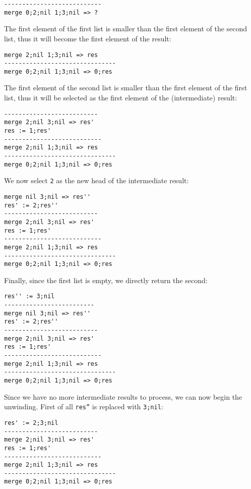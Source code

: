 \begin{lstlisting}
---------------------------
merge 0;2;nil 1;3;nil => ?
\end{lstlisting}

The first element of the first list is smaller than the first element of the second list, thus it will become the first element of the result:

\begin{lstlisting}
merge 2;nil 1;3;nil => res
-------------------------------
merge 0;2;nil 1;3;nil => 0;res
\end{lstlisting}

The first element of the second list is smaller than the first element of the first list, thus it will be selected as the first element of the (intermediate) result:

\begin{lstlisting}
--------------------------
merge 2;nil 3;nil => res'
res := 1;res'
---------------------------
merge 2;nil 1;3;nil => res
-------------------------------
merge 0;2;nil 1;3;nil => 0;res
\end{lstlisting}

We now select \texttt{2} as the new head of the intermediate result:

\begin{lstlisting}
merge nil 3;nil => res''
res' := 2;res''
--------------------------
merge 2;nil 3;nil => res'
res := 1;res'
---------------------------
merge 2;nil 1;3;nil => res
-------------------------------
merge 0;2;nil 1;3;nil => 0;res
\end{lstlisting}

Finally, since the first list is empty, we directly return the second:

\begin{lstlisting}
res'' := 3;nil
-------------------------
merge nil 3;nil => res''
res' := 2;res''
--------------------------
merge 2;nil 3;nil => res'
res := 1;res'
---------------------------
merge 2;nil 1;3;nil => res
-------------------------------
merge 0;2;nil 1;3;nil => 0;res
\end{lstlisting}

Since we have no more intermediate results to process, we can now begin the unwinding. First of all \texttt{res''} is replaced with \texttt{3;nil}:

\begin{lstlisting}
res' := 2;3;nil
--------------------------
merge 2;nil 3;nil => res'
res := 1;res'
---------------------------
merge 2;nil 1;3;nil => res
-------------------------------
merge 0;2;nil 1;3;nil => 0;res
\end{lstlisting}

